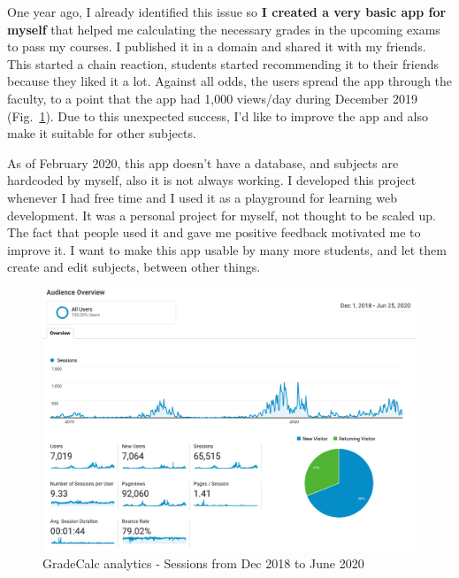One year ago, I already identified this issue so \textbf{I created a very basic app for myself} that helped me calculating the necessary grades in the upcoming exams to pass my courses. I published it in a domain and shared it with my friends. This started a chain reaction, students started recommending it to their friends because they liked it a lot. Against all odds, the users spread the app through the faculty, to a point that the app had 1,000 views/day during December 2019 (Fig.~\ref{fig:analytics_sessions_1}). Due to this unexpected success, I’d like to improve the app and also make it suitable for other subjects.

As of February 2020, this app doesn't have a database, and subjects are hardcoded by myself, also it is not always working. I developed this project whenever I had free time and I used it as a playground for learning web development. It was a personal project for myself, not thought to be scaled up. The fact that people used it and gave me positive feedback motivated me to improve it. I want to make this app usable by many more students, and let them create and edit subjects, between other things.



\vfill
\begin{figure}[h!]
    \center
    \includegraphics[width=1\columnwidth]{media/analytics.pdf}
    \caption{GradeCalc analytics - Sessions from Dec 2018 to June 2020}
    \label{fig:analytics_sessions_1}
\end{figure}
\vfill

